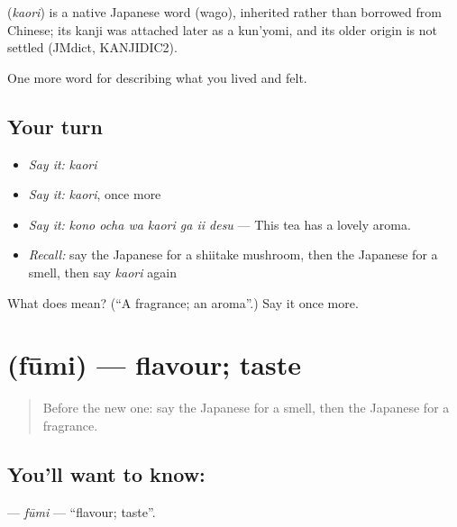 \begin{cousinweb}
\textbf{} (\emph{kaori}) is a native Japanese word (wago), inherited rather than borrowed from Chinese; its kanji was attached later as a kun'yomi, and its older origin is not settled (JMdict, KANJIDIC2).
\end{cousinweb}

\begin{grammarlens}[title={What you've built}]
One more word for describing what you lived and felt.
\end{grammarlens}

\subsection*{Your turn}
\begin{itemize}
\raggedright
  \item \emph{Say it:} \emph{kaori}
  \item \emph{Say it:} \emph{kaori}, once more
  \item \emph{Say it:} \emph{kono ocha wa kaori ga ii desu} — This tea has a lovely aroma.
  \item \emph{Recall:} say the Japanese for a shiitake mushroom, then the Japanese for a smell, then say \emph{kaori} again
\end{itemize}

\begin{tcolorbox}[breakable,colback=teal!4,colframe=teal!35!black,title={Before you move on}]
What does  mean? (\textquotedblleft{}A fragrance; an aroma\textquotedblright{}.) Say it once more.
\end{tcolorbox}
\section[\texorpdfstring{\ja{ふうみ} (fūmi)}{ふうみ (fūmi)}]{ (fūmi) — flavour; taste}

\label{lesson:JA-C495-fuumi}



\begin{quote}
Before the new one: say the Japanese for a smell, then the Japanese for a fragrance.
\end{quote}

\subsection*{You'll want to know: }
\textbf{} — \emph{fūmi} — \textquotedblleft{}flavour; taste\textquotedblright{}.

